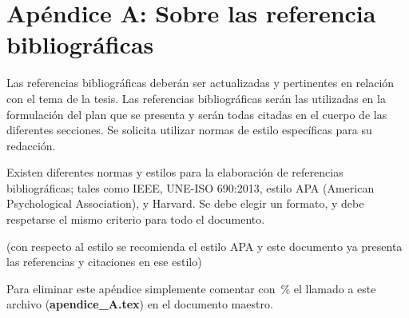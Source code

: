 

\section*{Apéndice A: Sobre las referencia bibliográficas}

Las referencias bibliográficas deberán ser actualizadas y pertinentes en relación con el tema de la tesis. Las referencias bibliográficas serán las utilizadas en la formulación del plan que se presenta y serán todas citadas en el cuerpo de las diferentes secciones. Se solicita utilizar normas de estilo específicas para su redacción. 

Existen diferentes normas y estilos para la elaboración de referencias bibliográficas; tales como IEEE, UNE-ISO 690:2013, estilo APA (American Psychological Association), y Harvard. Se debe elegir un formato, y debe respetarse el mismo criterio para todo el documento.

(con respecto al estilo se recomienda el estilo APA y este documento ya presenta las referencias y citaciones en ese estilo)

Para eliminar este apéndice simplemente comentar con \,\% el llamado a este archivo (\textbf{apendice\_A.tex}) en el documento maestro.
